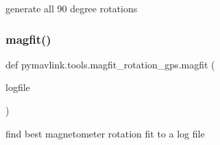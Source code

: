 \begin{DoxyVerb}generate all 90 degree rotations\end{DoxyVerb}
 \mbox{\label{namespacepymavlink_1_1tools_1_1magfit__rotation__gps_a3c0d998ef7946658f7d3085301310b90}} 
\subsubsection{\texorpdfstring{magfit()}{magfit()}}
{\footnotesize\ttfamily def pymavlink.\+tools.\+magfit\+\_\+rotation\+\_\+gps.\+magfit (\begin{DoxyParamCaption}\item[{}]{logfile }\end{DoxyParamCaption})}

\begin{DoxyVerb}find best magnetometer rotation fit to a log file\end{DoxyVerb}
 